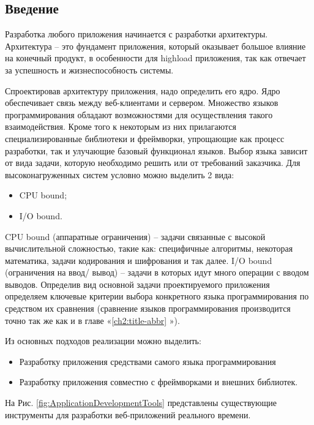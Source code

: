 \subsection{Введение} \label{ch2:subsec-abbr-introduction} %

Разработка любого приложения начинается с разработки архитектуры. Архитектура – это фундамент приложения, который оказывает большое влияние на конечный продукт, в особенности для highload приложения, так как отвечает за успешность и жизнеспособность системы.
	
Спроектировав архитектуру приложения, надо определить его ядро. Ядро обеспечивает связь между веб-клиентами и сервером. Множество языков программирования обладают возможностями для осуществления такого взаимодействия. Кроме того к некоторым из них прилагаются специализированные библиотеки и фреймворки, упрощающие как процесс разработки, так и улучающие  базовый функционал языков. Выбор языка зависит от вида задачи, которую необходимо решить или от требований заказчика. Для высоконагруженных систем условно можно выделить 2 вида:

\begin{itemize}
	\item CPU bound;
	\item I/O bound.
\end{itemize}
	
	
CPU bound (аппаратные ограничения) – задачи связанные с высокой вычислительной сложностью, такие как: специфичные алгоритмы, некоторая математика, задачи кодирования и шифрования и так далее. I/O bound (ограничения на ввод/ вывод) – задачи в которых идут много операции с вводом выводов. Определив вид основной задачи проектируемого приложения определяем ключевые критерии выбора конкретного языка программирования по средством их сравнения (сравнение языков программирования производится точно так же как и в главе «\ref{ch2:title-abbr} »).

Из основных подходов реализации можно выделить:

\begin{itemize}
	\item Разработку приложения средствами самого языка программирования
	\item Разработку приложения совместно с фреймворками и внешних библиотек.
\end{itemize}


На Рис. \ref{fig:ApplicationDevelopmentTools} представлены существующие инструменты для разработки веб-приложений реального времени.

